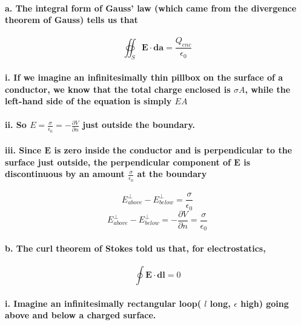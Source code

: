 \documentclass{article}
\begin{document}
\paragraph{\indent a. The integral form of Gauss' law (which came from the divergence theorem of Gauss) tells us that}
\begin{equation*}
    \oiint_S \boldsymbol{E\cdot da}=\frac{Q_{enc}}{\epsilon_0}
\end{equation*}
\paragraph{\indent\indent i. If we imagine an infinitesimally thin pillbox on the surface of a conductor, we know that the total charge enclosed is $\sigma A$, while the left-hand side of the equation is simply $EA$}
\paragraph{\indent\indent ii. So $E=\frac{\sigma}{\epsilon_0}=-\frac{\partial V}{\partial n}$ just outside the boundary.}
\paragraph{\indent\indent iii. Since $\boldsymbol{E}$ is zero inside the conductor and is perpendicular to the surface just outside, the perpendicular component of $\boldsymbol{E}$ is discontinuous by an amount $\frac{\sigma}{\epsilon_0}$ at the boundary}
\begin{equation*}
    E_{above}^{\perp}-E_{below}^{\perp} =\frac{\sigma}{\epsilon_0}
\end{equation*}
\begin{equation*}
     E_{above}^{\perp}-E_{below}^{\perp}=-\frac{\partial V}{\partial n}=\frac{\sigma}{\epsilon_0}
\end{equation*}
\paragraph{\indent b. The curl theorem of Stokes told us that, for electrostatics, }
\begin{equation*}
    \oint\boldsymbol{E\cdot dl}=0
\end{equation*}
\paragraph{\indent\indent i. Imagine an infinitesimally rectangular loop( $l$ long, $\epsilon$ high) going above and below a charged surface.}
\end{document}
